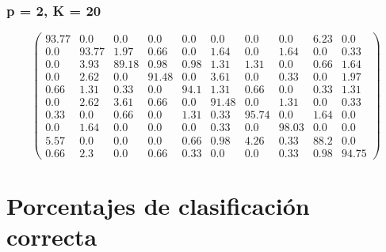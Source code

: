 \begin{appendices}
\subsubsection*{p = 2, K = 20}
$$\begin{pmatrix}
93.77&0.0&0.0&0.0&0.0&0.0&0.0&0.0&6.23&0.0\\
0.0&93.77&1.97&0.66&0.0&1.64&0.0&1.64&0.0&0.33\\
0.0&3.93&89.18&0.98&0.98&1.31&1.31&0.0&0.66&1.64\\
0.0&2.62&0.0&91.48&0.0&3.61&0.0&0.33&0.0&1.97\\
0.66&1.31&0.33&0.0&94.1&1.31&0.66&0.0&0.33&1.31\\
0.0&2.62&3.61&0.66&0.0&91.48&0.0&1.31&0.0&0.33\\
0.33&0.0&0.66&0.0&1.31&0.33&95.74&0.0&1.64&0.0\\
0.0&1.64&0.0&0.0&0.0&0.33&0.0&98.03&0.0&0.0\\
5.57&0.0&0.0&0.0&0.66&0.98&4.26&0.33&88.2&0.0\\
0.66&2.3&0.0&0.66&0.33&0.0&0.0&0.33&0.98&94.75
\end{pmatrix}$$

\section{Porcentajes de clasificación correcta}

\end{appendices}
